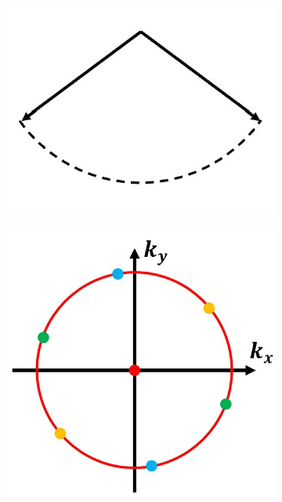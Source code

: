 \begin{figure}[h]
	\centering
	\begin{subfigure}[t]{0.25\textwidth}
		\centering
		\includegraphics[width=\linewidth]{images/amplitude_wave_vectors_2D.jpg}
		\caption{}
		\label{fig:amplitude_wave_vectors_2D}
	\end{subfigure}
	\begin{subfigure}[t]{0.265\textwidth}
		\centering
		\includegraphics[width=\linewidth]{images/3D_SIM_OTF_stripe_angles.jpg}

\end{subfigure}
\end{figure}
